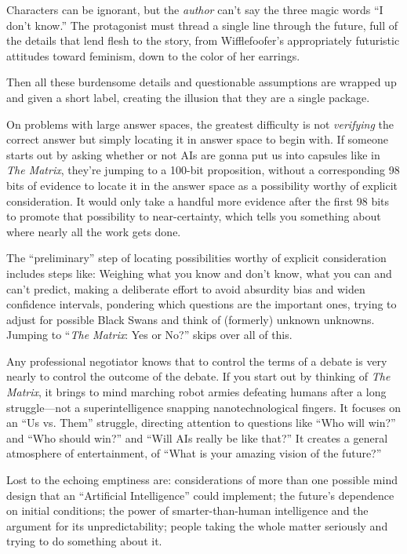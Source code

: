 {
 Characters can be ignorant, but the \textit{author}
can't say the three magic words ``I
don't know.'' The protagonist must
thread a single line through the future, full of the details that lend
flesh to the story, from Wifflefoofer's appropriately
futuristic attitudes toward feminism, down to the color of her
earrings.}

{
 Then all these burdensome details and questionable assumptions are
wrapped up and given a short label, creating the illusion that they are
a single package.}

{
 On problems with large answer spaces, the greatest difficulty is
not \textit{verifying} the correct answer but simply locating it in
answer space to begin with. If someone starts out by asking whether or
not AIs are gonna put us into capsules like in \textit{The Matrix},
they're jumping to a 100-bit proposition, without a
corresponding 98 bits of evidence to locate it in the answer space as a
possibility worthy of explicit consideration. It would only take a
handful more evidence after the first 98 bits to promote that
possibility to near-certainty, which tells you something about where
nearly all the work gets done.}

{
 The ``preliminary'' step of
locating possibilities worthy of explicit consideration includes steps
like: Weighing what you know and don't know, what you
can and can't predict, making a deliberate effort to
avoid absurdity bias and widen confidence intervals, pondering which
questions are the important ones, trying to adjust for possible Black
Swans and think of (formerly) unknown unknowns. Jumping to
``\textit{The Matrix}: Yes or No?''
skips over all of this.}

{
 Any professional negotiator knows that to control the terms of a
debate is very nearly to control the outcome of the debate. If you
start out by thinking of \textit{The Matrix}, it brings to mind
marching robot armies defeating humans after a long struggle---not a
superintelligence snapping nanotechnological fingers. It focuses on an
``Us vs. Them'' struggle, directing
attention to questions like ``Who will
win?'' and ``Who should
win?'' and ``Will AIs really be like
that?'' It creates a general atmosphere of
entertainment, of ``What is your amazing vision of the
future?''}

{
 Lost to the echoing emptiness are: considerations of more than one
possible mind design that an ``Artificial
Intelligence'' could implement; the
future's dependence on initial conditions; the power of
smarter-than-human intelligence and the argument for its
unpredictability; people taking the whole matter seriously and trying
to do something about it.}

